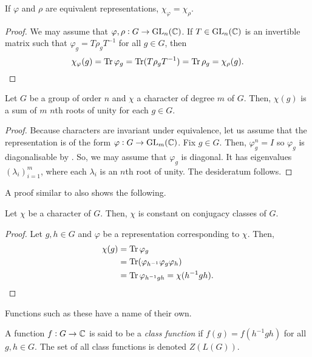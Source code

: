 		\begin{prop}
			\label{prop: character same under equiv}
			If $\varphi$ and $\rho$ are equivalent representations, $\chi_\varphi = \chi_\rho$.
		\end{prop}
		\begin{proof}
			We may assume that $\varphi,\rho : G \to \operatorname{GL}_n(\mathbb{C})$. If $T \in \operatorname{GL}_n(\mathbb{C})$ is an invertible matrix such that $\varphi_g = T \rho_g T^{-1}$ for all $g \in G$, then
			\[ \chi_\varphi(g) = \operatorname{Tr} \varphi_g = \operatorname{Tr} (T \rho_g T^{-1}) = \operatorname{Tr} \rho_g = \chi_\rho(g). \qedhere \]
		\end{proof}

		\begin{corollary}
			Let $G$ be a group of order $n$ and $\chi$ a character of degree $m$ of $G$. Then, $\chi(g)$ is a sum of $m$ $n$th roots of unity for each $g \in G$.
		\end{corollary}
		\begin{proof}
			Because characters are invariant under equivalence, let us assume that the representation is of the form $\varphi : G \to \operatorname{GL}_m(\mathbb{C})$. Fix $g \in G$. Then, $\varphi_g^n = I$ so $\varphi_g$ is diagonalisable by . So, we may assume that $\varphi_g$ is diagonal. It has eigenvalues $(\lambda_i)_{i=1}^m$, where each $\lambda_i$ is an $n$th root of unity. The desideratum follows.
		\end{proof}

		A proof similar to  also shows the following.

		\begin{fprop}
			Let $\chi$ be a character of $G$. Then, $\chi$ is constant on conjugacy classes of $G$.
		\end{fprop}
		\begin{proof}
			Let $g,h \in G$ and $\varphi$ be a representation corresponding to $\chi$. Then,
			\begin{align*}
				\chi(g) &= \operatorname{Tr} \varphi_g \\
					&= \operatorname{Tr} (\varphi_{h^{-1}} \varphi_g \varphi_h) \\
					&= \operatorname{Tr} \varphi_{h^{-1}gh} = \chi(h^{-1}gh). \qedhere
			\end{align*}
		\end{proof}

		Functions such as these have a name of their own.

		\begin{fdef}
			A function $f : G \to \mathbb{C}$ is said to be a \emph{class function} if $f(g) = f(h^{-1}gh)$ for all $g,h \in G$. The set of all class functions is denoted $Z(L(G))$.
		\end{fdef}

